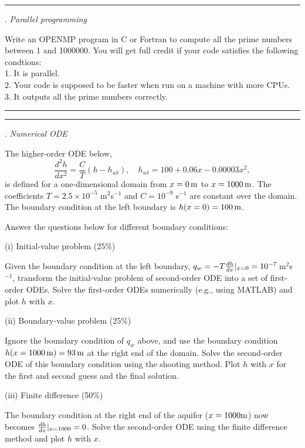 \documentclass [11point]{article}
\begin{document}
\pagebreak
\hrule 
{}. \textit{Parallel programming}
\bigskip

Write an OPENMP program in C or Fortran to compute all the prime numbers between 1 and 1000000. You will get full credit if your code satisfies the following condtions:\\
1. It is parallel.\\
2. Your code is supposed to be faster when run on a machine with more CPUs.\\
3. It outputs all the prime numbers correctly.

\bigskip
\hrule 




\pagebreak
\hrule 
{}. \textit{Numerical ODE}

\bigskip

The higher-order ODE below,$$
\frac{d^2 h}{dx^2} = \frac{C}{T} (h-h_{wt}), \quad h_{wt} = 100 + 0.06x - 0.00003x^2,$$
is defined for a one-dimensional domain from $x = 0\,\rm{m}$ to $x = 1000\,\rm{m}$. The coefficients $T = 2.5 \times 10^{-5}$ m$^2$s$^{-1}$ and $C = 10^{-9}$ s$^{-1}$ are constant over the domain. The boundary condition at the left boundary is $h(x=0)=100\,\rm{m}$.  

\medskip

Answer the questions below for different boundary conditions:

\medskip

(i) Initial-value problem (25\%)  

\smallskip

Given the boundary condition at the left boundary, $q_w = -T \frac{dh}{dx}\Large|_{x=0} = 10^{-7}\,$m$^2$s$^{-1}$, transform the initial-value problem of second-order ODE into a set of first-order ODEs. Solve the first-order ODEs numerically (e.g., using MATLAB) and plot $h$ with $x$.

\medskip

(ii) Boundary-value problem (25\%)

\smallskip
Ignore the boundary condition of $q_w$ above, and use the boundary condition $h( x = 1000\,\rm{m})= 93\,\rm{m}$ at the right end of the domain. Solve the second-order ODE of this boundary condition using the shooting method. Plot $h$ with $x$ for the first and second guess and the final solution.

\medskip

(iii) Finite difference (50\%) 
\smallskip

The boundary condition at the right end of the aquifer ($x=1000\rm{m}$) now becomes  $\frac{dh}{dx}\Large|_{x=1000} = 0$. Solve the second-order ODE using the finite difference method and plot $h$ with $x$. 
\end{document}
